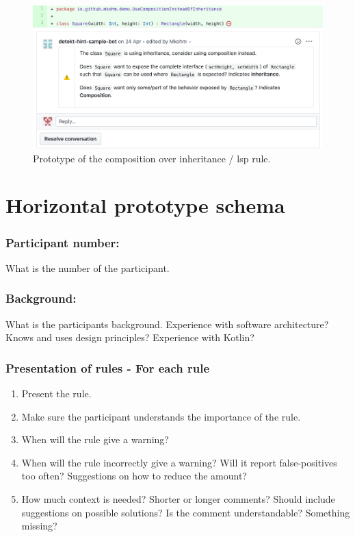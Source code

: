 \begin{figure}[h!]
    \centering
    \includegraphics[width=\textwidth]{images/horizontal-prototype-coh.png}
    \caption{Prototype of the composition over inheritance / \gls{lsp} rule.}
    \label{fig:liskov}
\end{figure}

\clearpage

\section{Horizontal prototype schema}
\label{semi-structured-interview-schema}
\subsubsection*{Participant number:} What is the number of the participant.
\subsubsection*{Background:} What is the participants background. Experience with software architecture? Knows and uses design principles? Experience with Kotlin?
\subsubsection*{Presentation of rules - For each rule}
\begin{enumerate}
    \item Present the rule. 
    \item Make sure the participant understands the importance of the rule.
    \item When will the rule give a warning?
    \item When will the rule incorrectly give a warning? Will it report false-positives too often? Suggestions on how to reduce the amount?
    \item How much context is needed? Shorter or longer comments? Should include suggestions on possible solutions? Is the comment understandable? Something missing?
\end{enumerate}


